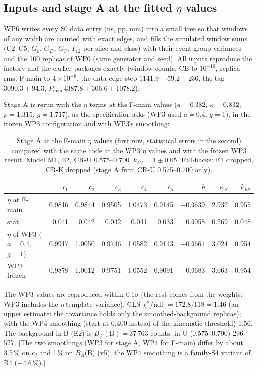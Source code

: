 \documentclass[11pt,a4paper]{article}
\newcommand{\Pmain}{\ensuremath{P_{\mathrm{main}}}\xspace}
\newcommand{\kB}{\ensuremath{\kappa_B}\xspace}
\newcommand{\kEtwo}{\ensuremath{k_{E2}}\xspace}
\newcommand{\Geta}{\ensuremath{G_\eta}\xspace}
\newcommand{\flag}[1]{\textcolor{red!60!black}{[#1]}}
\begin{document}
\subsection{Inputs and stage A at the fitted \texorpdfstring{$\eta$}{eta} values}
WP6 writes every S0 data entry (us, pp, mm) into a small tree so that windows of any width are counted with exact edges, and fills the
simulated window sums (C2--C5, \Geta, $G_D$, $G_C$, $T_{12}$ per slice and class) with their event-group variances and the 100 replicas of
WP0 (same generator and seed). All inputs reproduce the factory and the earlier packages exactly (window counts, CB to $10^{-10}$, replica
rms, F-main to $4\times10^{-8}$, the data edge step $1141.9\pm59.2\pm236$, the tag $3090.3\pm94.3$, \Pmain $4387.8\pm306.6\pm1078.2$).

Stage A is rerun with the $\eta$ terms at the F-main values ($a=0.382$, $\kappa=0.832$, $\rho=1.315$, $g=1.717$), as the specification asks
(WP3 used $a=0.4$, $g=1$), in the frozen WP3 configuration and with WP3's smoothing:

\begin{table}[H]
\centering
\caption{Stage A at the F-main $\eta$ values (first row, statistical errors in the second) compared with the same code at the WP3 $\eta$
values and with the frozen WP3 result. Model M1, E2, CR-U 0.575--0.700, \kEtwo$=1\pm0.05$. Fall-backs: E1 dropped, CR-K dropped (stage A from CR-U 0.575--0.700 only).}
\label{tab:stageA6}
\small
\begin{tabular}{@{}l r r r r r r r r@{}}
\toprule
 & $c_1$ & $c_2$ & $c_3$ & $c_4$ & $c_5$ & $b$ & \kB & \kEtwo \\
\midrule
$\eta$ at F-main & 0.9816 & 0.9844 & 0.9505 & 1.0473 & 0.9145 & $-0.0639$ & 2.932 & 0.955 \\
stat & 0.041 & 0.042 & 0.042 & 0.041 & 0.033 & 0.0058 & 0.269 & 0.048 \\
$\eta$ of WP3 ($a=0.4$, $g=1$) & 0.9917 & 1.0050 & 0.9746 & 1.0582 & 0.9113 & $-0.0661$ & 3.024 & 0.954 \\
WP3 frozen & 0.9878 & 1.0012 & 0.9751 & 1.0552 & 0.9091 & $-0.0683$ & 3.063 & 0.954 \\
\bottomrule
\end{tabular}
\end{table}

The WP3 values are reproduced within 0.1$\sigma$ (the rest comes from the weights: WP3 includes the $\eta$-template variance). GLS
$\chi^2$/ndf $=172.8/118=1.46$ (an upper estimate: the covariance holds only the smoothed-background replicas); with the WP4 smoothing
(start at 0.400 instead of the kinematic threshold) 1.56. The background in B (E2) is $B_A(\mathrm{B})=37\,763$ counts, in U (0.575--0.700)
296\,527. \flag{The two smoothings (WP3 for stage A, WP4 for F-main) differ by about 3.5\,\% on $c_j$ and 1\,\% on $B_A$(B) (v5); the WP4
smoothing is a family-S4 variant of B4 ($+4.6$\,\%).}
\end{document}
